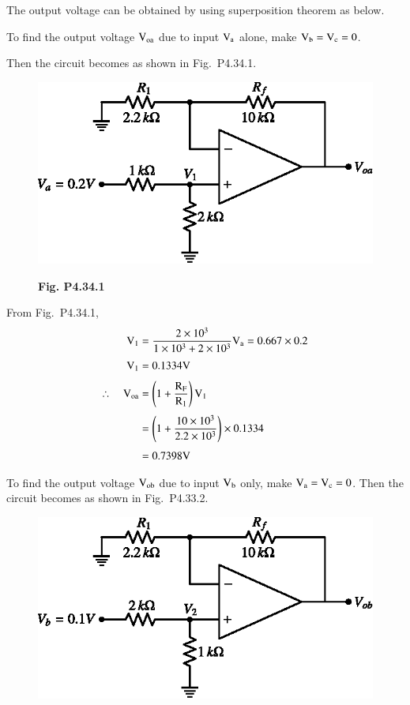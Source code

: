 \begin{solution}
The output voltage can be obtained by using superposition theorem as below. 

\smallskip
To find the output voltage $\textrm{V}_{\textrm{o}\textrm{a}}$ due to input $\textrm{V}_{\textrm{a}}$ alone, make $\textrm{V}_{\textrm{b}}=\textrm{V}_{\textrm{c}}=0$.

\smallskip
Then the circuit becomes as shown in Fig.~P4.34.1.
\begin{figure}[H]
\centering
\includegraphics[scale=.96]{chap4/figP4.33.1.eps}

\smallskip
{\bf Fig. P4.34.1}
\end{figure}

From Fig.~P4.34.1,
\begin{align*}
\textrm{V}_{1} &= \frac{2\times 10^{3}}{1\times 10^{3}+2\times 10^{3}}\textrm{V}_{\textrm{a}}= 0.667\times 0.2\\[3pt]
\textrm{V}_{1} &= 0.1334\textrm{V}\\[3pt]
\therefore\quad \textrm{V}_{\textrm{o}\textrm{a}} &= \left(1+\frac{\textrm{R}_{\textrm{F}}}{\textrm{R}_{1}}\right)\textrm{V}_{1}\\[3pt]
&= \left(1+\frac{10\times 10^{3}}{2.2\times 10^{3}}\right)\times 0.1334\\[3pt]
&= 0.7398\textrm{V}
\end{align*}

To find the output voltage $\textrm{V}_{\textrm{o}\textrm{b}}$ due to input $\textrm{V}_{\textrm{b}}$ only, make $\textrm{V}_{\textrm{a}}=\textrm{V}_{\textrm{c}}=0$. Then the circuit becomes as shown in Fig.~P4.33.2.
\begin{figure}[H]
\centering
\includegraphics{chap4/figP4.33.2.eps}


\end{figure}
\end{solution}
